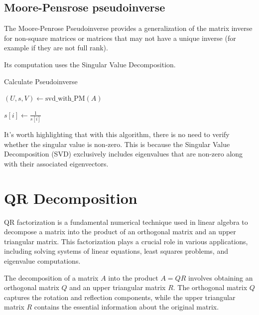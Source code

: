 \documentclass{article}
\begin{document}
    \subsection{Moore-Pensrose pseudoinverse}
    The Moore-Penrose Pseudoinverse provides a generalization of the matrix inverse for non-square matrices or matrices that may not have a unique inverse (for example if they are not full rank).  
    
    Its computation uses the Singular Value Decomposition.
    
    \begin{algorithm}
    \caption{Calculate Pseudoinverse}
    \begin{algorithmic}[1]
        \State {}
        \State $(U, s, V) \gets \text{svd\_with\_PM}(A)$
    
         
            \State $s[i] \gets \frac{1}{s[i]}$  
        \EndFor
    
    \EndFunction
    \end{algorithmic}
    \end{algorithm}
    
    It's worth highlighting that with this algorithm, there is no need to verify whether the singular value is non-zero. This is because the Singular Value Decomposition (SVD) exclusively includes eigenvalues that are non-zero along with their associated eigenvectors.

\section{QR Decomposition}

QR factorization is a fundamental numerical technique used in linear algebra to decompose a matrix into the product of an orthogonal matrix and an upper triangular matrix. This factorization plays a crucial role in various applications, including solving systems of linear equations, least squares problems, and eigenvalue computations.

The decomposition of a matrix $A$ into the product $A = QR$ involves obtaining an orthogonal matrix $Q$ and an upper triangular matrix $R$. The orthogonal matrix $Q$ captures the rotation and reflection components, while the upper triangular matrix $R$ contains the essential information about the original matrix.
\end{document}
